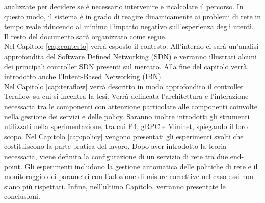 analizzate per decidere se è necessario intervenire e ricalcolare il percorso.
In questo modo, il sistema è in grado di reagire dinamicamente ai problemi di rete in tempo reale riducendo al minimo l'impatto negativo sull'esperienza degli utenti.
\\Il resto del documento sarà organizzato come segue.
\\Nel Capitolo \ref{cap:contesto} verrà esposto il contesto. All'interno ci sarà un'analisi approfondita del Software Defined Networking (SDN)
e verranno illustrati alcuni dei principali controller SDN presenti sul mercato. Alla fine del capitolo verrà, introdotto anche l'Intent-Based Networking (IBN).
\\Nel Capitolo \ref{cap:teraflow} verrà descritto in modo approfondito il controller Teraflow su cui si incentra la tesi.
Verrà delineata l'architettura e l'interazione necessaria tra le componenti con attenzione particolare alle componenti coinvolte nella gestione dei servizi e delle policy.
Saranno inoltre introdotti gli strumenti utilizzati nella sperimentazione, tra cui P4, gRPC e Mininet, spiegando il loro scopo.
Nel Capitolo \ref{cap:policy} vengono presentati gli esperimenti svolti che costituiscono la parte pratica del lavoro.
Dopo aver introdotto la teoria necessaria, viene definita la configurazione di un servizio di rete tra due end-point. Gli esperimenti includono la gestione
automatica delle politiche di rete e il monitoraggio dei parametri con l'adozione di misure correttive nel caso essi non siano più rispettati.
Infine, nell'ultimo Capitolo, verranno presentate le conclusioni.
